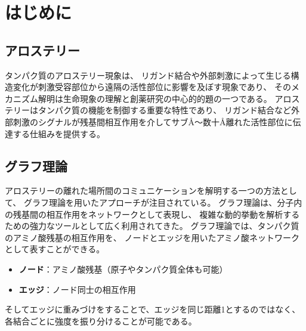 \section{はじめに}

\subsection{アロステリー}
タンパク質のアロステリー現象は、
リガンド結合や外部刺激によって生じる構造変化が刺激受容部位から遠隔の活性部位に影響を及ぼす現象であり、
そのメカニズム解明は生命現象の理解と創薬研究の中心的的題の一つである。
アロステリーはタンパク質の機能を制御する重要な特性であり\cite{Cui2009}、
リガンド結合など外部刺激のシグナルが残基間相互作用を介してサブÅ～数十Å離れた活性部位に伝達する仕組みを提供する。

\subsection{グラフ理論}
アロステリーの離れた場所間のコミュニケーションを解明する一つの方法として、
グラフ理論\cite{Zhou2018}を用いたアプローチが注目されている。
グラフ理論は、分子内の残基間の相互作用をネットワークとして表現し、
複雑な動的挙動を解析するための強力なツールとして広く利用されてきた\cite{Doncheva2011}\cite{Martin2011}\cite{Doncheva2012}。
グラフ理論では、タンパク質のアミノ酸残基の相互作用を、
ノードとエッジを用いたアミノ酸ネットワークとして表すことができる。
\begin{itemize}
  \item \textbf{ノード}：アミノ酸残基（原子やタンパク質全体も可能）
  \item \textbf{エッジ}：ノード同士の相互作用
\end{itemize}

そしてエッジに重みづけをすることで、エッジを同じ距離1とするのではなく、
各結合ごとに強度を振り分けることが可能である。


